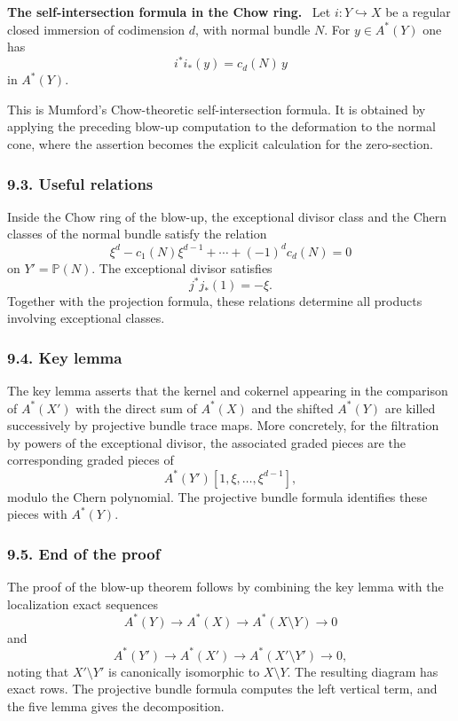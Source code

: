 \documentclass[14pt]{extarticle}
\newenvironment{statement}[1]{\par\medskip\noindent\textbf{#1.}\ }{\par\medskip}
\begin{document}
\begin{statement}{The self-intersection formula in the Chow ring}
Let $i:Y\hookrightarrow X$ be a regular closed immersion of codimension $d$, with normal bundle $N$. For $y\in A^*(Y)$ one has
\[
   i^*i_*(y)=c_d(N)\,y
\]
in $A^*(Y)$.
\end{statement}

This is Mumford's Chow-theoretic self-intersection formula. It is obtained by applying the preceding blow-up computation to the deformation to the normal cone, where the assertion becomes the explicit calculation for the zero-section.

\subsubsection*{9.3. Useful relations}

Inside the Chow ring of the blow-up, the exceptional divisor class and the Chern classes of the normal bundle satisfy the relation
\[
   \xi^d-c_1(N)\xi^{d-1}+\cdots+(-1)^d c_d(N)=0
\]
on $Y'=\mathbb P(N)$. The exceptional divisor satisfies
\[
   j^*j_*(1)=-\xi.
\]
Together with the projection formula, these relations determine all products involving exceptional classes.

\subsubsection*{9.4. Key lemma}

The key lemma asserts that the kernel and cokernel appearing in the comparison of $A^*(X')$ with the direct sum of $A^*(X)$ and the shifted $A^*(Y)$ are killed successively by projective bundle trace maps. More concretely, for the filtration by powers of the exceptional divisor, the associated graded pieces are the corresponding graded pieces of
\[
   A^*(Y')[1,\xi,\ldots,\xi^{d-1}],
\]
modulo the Chern polynomial. The projective bundle formula identifies these pieces with $A^*(Y)$.

\subsubsection*{9.5. End of the proof}

The proof of the blow-up theorem follows by combining the key lemma with the localization exact sequences
\[
   A^*(Y)\to A^*(X)\to A^*(X\setminus Y)\to0
\]
and
\[
   A^*(Y')\to A^*(X')\to A^*(X'\setminus Y')\to0,
\]
noting that $X'\setminus Y'$ is canonically isomorphic to $X\setminus Y$. The resulting diagram has exact rows. The projective bundle formula computes the left vertical term, and the five lemma gives the decomposition.
\end{document}
